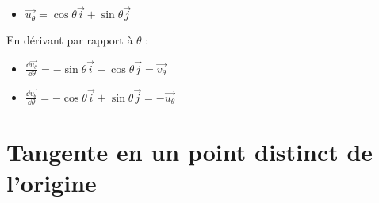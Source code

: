\begin{frame}



\begin{minipage}{0.49\textwidth}
\begin{itemize}
  \item $\overrightarrow{u_\theta}=\cos\theta\overrightarrow{i}+\sin\theta\overrightarrow{j}$
\end{itemize}  
\end{minipage}
\begin{minipage}{0.49\textwidth}
\end{minipage}

\pause
\vspace*{-0.8cm}
\pause
En dérivant par rapport à $\theta$ :
\begin{itemize}
  \item $\displaystyle \frac{\dd\overrightarrow{u_\theta}}{\dd\theta}
=-\sin\theta\overrightarrow{i}+\cos\theta\overrightarrow{j}
=\overrightarrow{v_\theta}$
  \item $\displaystyle \frac{\dd\overrightarrow{v_\theta}}{\dd\theta}=-\cos\theta\overrightarrow{i}+\sin\theta\overrightarrow{j}
=-\overrightarrow{u_\theta}$ 
\end{itemize}

\pause
{}


\end{frame}







\section{Tangente en un point distinct de l'origine}

